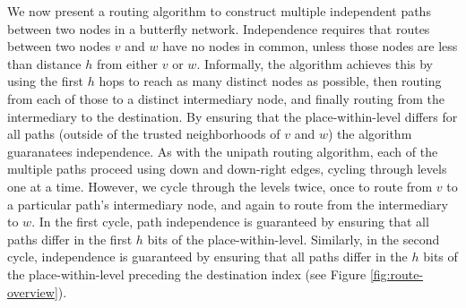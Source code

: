 \documentclass{sig-alternate-05-2015}
\begin{document}
We now present a routing algorithm to construct multiple independent paths
between two nodes in a butterfly network.
Independence requires that routes between two nodes $v$ and $w$ have no nodes
in common, unless those nodes are less than distance $h$ from either $v$ or $w$.
Informally, the algorithm achieves this by using the first $h$ hops to
reach as many distinct nodes as possible,
then routing from each of those to a distinct intermediary node,
and finally routing from the intermediary to the destination.
By ensuring that the place-within-level differs for all paths
(outside of the trusted neighborhoods of $v$ and $w$)
the algorithm guaranatees independence.
As with the unipath routing algorithm,
each of the multiple paths proceed using down and down-right edges,
cycling through levels one at a time.
However, we cycle through the levels twice, once to route from $v$ to a
particular path's intermediary node,
and again to route from the intermediary to $w$.
In the first cycle, path independence is guaranteed by ensuring that
all paths differ in the first $h$ bits of the place-within-level.
Similarly, in the second cycle,
independence is guaranteed by ensuring that all paths differ in the
$h$ bits of the place-within-level preceding the destination index
(see Figure \ref{fig:route-overview}).
\end{document}
